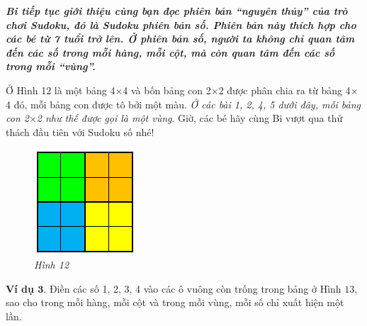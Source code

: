 	\graphicspath{{../suyluancungbi/sudoku2/}}
	\vskip 0.2cm
	\textit{\textbf{Bi tiếp tục giới thiệu cùng bạn đọc phiên bản “nguyên thủy” của trò chơi Sudoku, đó là Sudoku phiên bản số. Phiên bản này thích hợp cho các bé từ 7 tuổi trở lên.
	Ở phiên bản số, người ta không chỉ quan tâm đến các số trong mỗi hàng, mỗi cột, mà còn quan tâm đến các số trong mỗi “vùng”.}}
	\begin{multicols}{2}
		Ở Hình 12 là một bảng 4$\times$4 và bốn bảng con 2$\times$2 được phân chia ra từ bảng 4$\times$4 đó, mỗi bảng con được tô bởi một màu. \textit{Ở các bài 1, 2, 4, 5 dưới đây, mỗi bảng con 2$\times$2 như thế được gọi là một vùng}.
		\vskip 0.1cm
		Giờ, các bé hãy cùng Bi vượt qua thử thách đầu tiên với Sudoku  số nhé!
		\begin{figure}[H]
			\centering
			\vspace*{5pt}
			\captionsetup{labelformat= empty, justification=centering}
			\includegraphics[scale=1]{pic1}
			\caption{\small\textit{Hình 12}}
			\vspace*{-10pt}
		\end{figure}
	\end{multicols}
		\textbf{Ví dụ $\pmb{3.}$} Điền các số 1, 2, 3, 4 vào các ô vuông còn trống trong bảng ở Hình $13$, sao cho trong mỗi hàng, mỗi cột và trong mỗi vùng, mỗi số chỉ xuất hiện một lần.
	
